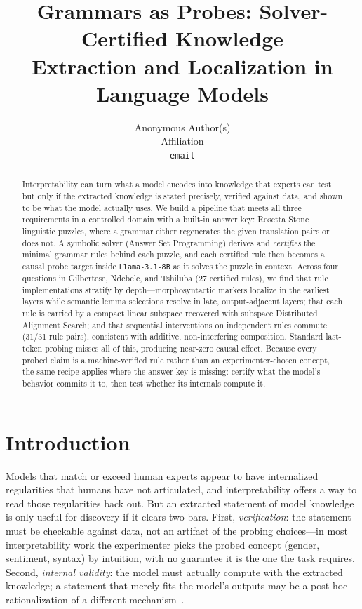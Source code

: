 \documentclass{article}
\title{Grammars as Probes: Solver-Certified Knowledge\\
Extraction and Localization in Language Models}
\author{%
  Anonymous Author(s)\\
  Affiliation\\
  \texttt{email}\\
}
\begin{document}
\maketitle

\begin{abstract}
Interpretability can turn what a model encodes into knowledge that experts can
test---but only if the extracted knowledge is stated precisely, verified
against data, and shown to be what the model actually uses. We build a
pipeline that meets all three requirements in a controlled domain with a
built-in answer key: Rosetta Stone linguistic puzzles, where a grammar either
regenerates the given translation pairs or does not. A symbolic solver (Answer
Set Programming) derives and \emph{certifies} the minimal grammar rules behind
each puzzle, and each certified rule then becomes a causal probe target inside
\texttt{Llama-3.1-8B} as it solves the puzzle in context. Across four
questions in Gilbertese, Ndebele, and Tshiluba (27 certified rules), we find
that rule implementations stratify by depth---morphosyntactic markers localize
in the earliest layers while semantic lemma selections resolve in late,
output-adjacent layers; that each rule is carried by a compact linear subspace
recovered with subspace Distributed Alignment Search; and that sequential
interventions on independent rules commute (31/31 rule pairs), consistent with
additive, non-interfering composition. Standard last-token probing misses all
of this, producing near-zero causal effect. Because every probed claim is a
machine-verified rule rather than an experimenter-chosen concept, the same
recipe applies where the answer key is missing: certify what the model's
behavior commits it to, then test whether its internals compute it.
\end{abstract}

\section{Introduction}
\label{sec:intro}

Models that match or exceed human experts appear to have internalized
regularities that humans have not articulated, and interpretability offers a
way to read those regularities back out. But an extracted statement of model
knowledge is only useful for discovery if it clears two bars. First,
\emph{verification}: the statement must be checkable against data, not an
artifact of the probing choices---in most interpretability work the
experimenter picks the probed concept (gender, sentiment, syntax) by
intuition, with no guarantee it is the one the task requires.
Second, \emph{internal validity}: the model must actually
compute with the extracted knowledge; a statement that merely fits the model's
outputs may be a post-hoc rationalization of a different
mechanism~\citep{lanham2023,turpin2023}.
\end{document}
